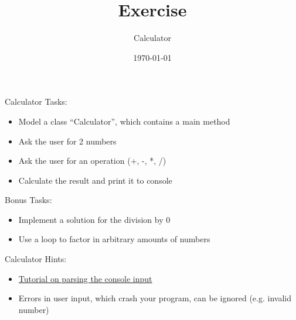 


\title{Exercise}
\subtitle{Calculator}
\date{\today}




\begin{frame}
    \titlepage
\end{frame}

\begin{frame}{Calculator}
    Tasks:
    \begin{itemize}
        \item Model a class ``Calculator'', which contains a main method
        \item Ask the user for 2 numbers
        \item Ask the user for an operation (+, -, *, /)
        \item Calculate the result and print it to console
    \end{itemize}
    Bonus Tasks:
    \begin{itemize}
        \item Implement a solution for the division by 0
        \item Use a loop to factor in arbitrary amounts of numbers
    \end{itemize}
\end{frame}

\begin{frame}{Calculator}
    Hints:
    \begin{itemize}
        \item \href{http://alvinalexander.com/java/edu/pj/pj010005}{Tutorial on parsing the console input}
        \item Errors in user input, which crash your program, can be ignored (e.g. invalid number)
    \end{itemize}
\end{frame}



